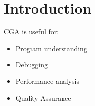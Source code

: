\section{Introduction}

CGA is useful for:

\begin{itemize}
	\item Program understanding
	\item Debugging
	\item Performance analysis
	\item Quality Assurance
\end{itemize}

